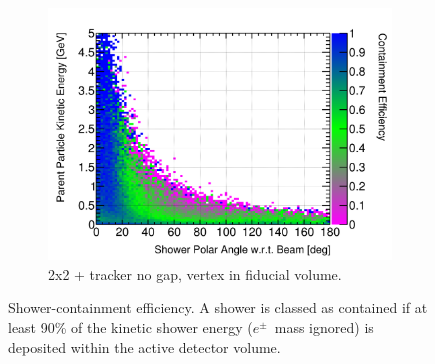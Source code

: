 \documentclass[10pt,a4paper,openany]{article}
\begin{document}
\begin{figure}[htbp]
\begin{subfigure}[b]{0.49\textwidth}
		\includegraphics[width=1.0\textwidth]{EM_cont_eff_2x2_Scintillator_fiducial.png}
		\caption{2x2 + tracker no gap, vertex in fiducial volume.}
		\label{}
	\end{subfigure}	
	\caption{Shower-containment efficiency. A shower is classed as contained if at least 90\% of the kinetic shower energy ($e^{\pm}$~mass ignored) is deposited within the active detector volume.}
\end{figure}
\end{document}
